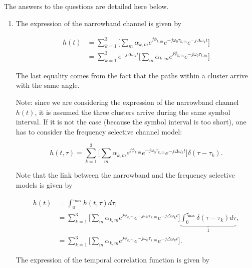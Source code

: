\documentclass [a4paper, 11pt] {article}
\begin{document}
    \begin{solution}
        The answers to the questions are detailed here below.

    
        \begin{enumerate}
        \item The expression of the narrowband channel is given by 
        
        \begin{align}
         h(t) &=  \sum_{k=1}^{3} \Big[ \sum_m \alpha_{k,m} e^{j\phi_{k,m}}e^{-j\omega_0 \tau_{k,m}}e^{-j\Delta \omega_{k} t} \Big] \\
         & = \sum_{k=1}^{3} e^{-j\Delta \omega_{k} t} \Big[ \sum_m \alpha_{k,m} e^{j\phi_{k,m}} e^{-j\omega_0 \tau_{k,m}}  \Big]
        \end{align}
        
        The last equality comes from the fact that the paths within a cluster arrive with the same angle. 
        
        Note: since we are considering the expression of the narrowband channel $h(t)$, it is assumed the three clusters arrive during the same symbol interval. If it is not the case (because the symbol interval is too short), one has to consider the frequency selective channel model: 
        
        \begin{equation} h(t,\tau) =  \sum_{k=1}^{3} \Big[ \sum_m \alpha_{k,m} e^{j\phi_{k,m}}e^{-j\omega_0 \tau_{k,m}}e^{-j\Delta \omega_{k} t}\Big] \delta(\tau-\tau_k).
        \end{equation}
        
        Note that the link between the narrowband and the frequency selective models is given by 
        
        \begin{align}
            h(t) &= \int_{0}^{\tau_{\text{max}}} h(t,\tau)d\tau, \\
             &= \sum_{k=1}^{3} \Big[ \sum_m \alpha_{k,m} e^{j\phi_{k,m}}e^{-j\omega_0 \tau_{k,m}}e^{-j\Delta \omega_{k} t}\Big] \underbrace{\int_{0}^{\tau_{\text{max}}} \delta(\tau-\tau_k)d\tau}_{1}, \\
             &= \sum_{k=1}^{3} \Big[ \sum_m \alpha_{k,m} e^{j\phi_{k,m}}e^{-j\omega_0 \tau_{k,m}}e^{-j\Delta \omega_{k} t}\Big].
        \end{align}
        
        The expression of the temporal correlation function is given by 
        

\end{enumerate}
\end{solution}
\end{document}
